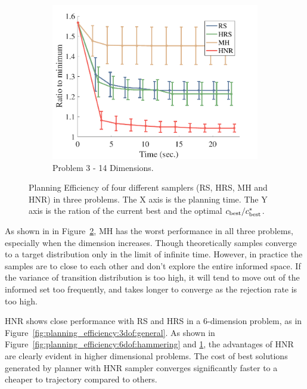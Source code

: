 \documentclass[letterpaper, 10 pt, conference]{ieeeconf}  %
\begin{document}
\begin{figure}[t!]
\begin{subfigure}[b]{0.325\textwidth}
	\includegraphics[width=\linewidth]{fig/planning_efficiency/herb_batting_efficiency}
	\caption{\captionstyle Problem 3 - 14 Dimensions.}
	\label{fig:planning_efficiency:herb:batting}
    \end{subfigure}
	\caption{\captionstyle Planning Efficiency of four different samplers (RS, HRS, MH and HNR) in three problems. 
	The X axis is the planning time. 
	The Y axis is the ration of the current best and the optimal $ c_{\rm best} / c^*_{\rm best} $.}
	\label{fig:planning_efficiency}
\end{figure} 


As shown in in Figure~\ref{fig:planning_efficiency}, MH has the worst performance in all three problems, especially when the dimension increases.
Though theoretically samples converge to a target distribution only in the limit of infinite time. However, in practice the samples are to close to each other and don't explore the entire informed space.
If the variance of transition distribution is too high, it will tend to move out of the informed set too frequently, and takes longer to converge as the rejection rate is too high.

HNR shows close performance with RS and HRS in a 6-dimension problem, as in Figure~\ref{fig:planning_efficiency:3dof:general}. 
As shown in Figure~\ref{fig:planning_efficiency:6dof:hammering} and \ref{fig:planning_efficiency:herb:batting}, the advantages of HNR are clearly evident in higher dimensional problems. The cost of best solutions generated by planner with HNR sampler converges significantly faster to a cheaper to trajectory compared to others.
\end{document}
